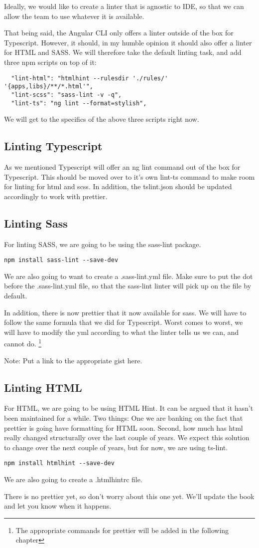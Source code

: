 Ideally, we would like to create a linter that is agnostic to IDE, so that we
can allow the team to use whatever it is available.

That being said, the Angular CLI only offers a linter outside of the box for
Typescript. However, it should, in my humble opinion it should also offer a
linter for HTML and SASS. We will therefore take the default linting task, and
add three npm scripts on top of it:

\begin{lstlisting}
  "lint-html": "htmlhint --rulesdir './rules/' '{apps,libs}/**/*.html'",
  "lint-scss": "sass-lint -v -q",
  "lint-ts": "ng lint --format=stylish",
\end{lstlisting}

We will get to the specifics of the above three scripts right now.

\subsection{ Linting Typescript }
As we mentioned Typescript will offer an ng lint command out of the box for
Typescript. This should be moved over to it's own lint-ts command to make room
for linting for html and scss. In addition, the tslint.json should be updated
accordingly to work with prettier.

\subsection{ Linting Sass }
For linting SASS, we are going to be using the sass-lint package.
\begin{lstlisting}
npm install sass-lint --save-dev
\end{lstlisting}

We are also going to want to create a .sass-lint.yml file. Make sure to put the
dot before the .sass-lint.yml file, so that the sass-lint linter will pick up
on the file by default.

In addition, there is now prettier that it now available for sass. We will have
to follow the same formula that we did for Typescript. Worst comes to worst, we
will have to modify the yml according to what the linter tells us we can, and
cannot do. \footnote{The appropriate commands for prettier will be added in the
following chapter}

Note: Put a link to the appropriate gist here.

\subsection{ Linting HTML }
For HTML, we are going to be using HTML Hint. It can be argued that it hasn't
been maintained for a while. Two things: One we are banking on the fact that
prettier is going have formatting for HTML soon. Second, how much has html really
changed structurally over the last couple of years. We expect this solution to
change over the next couple of years, but for now, we are using ts-lint.

\begin{lstlisting}
npm install htmlhint --save-dev
\end{lstlisting}

We are also going to create a .htmlhintrc file.

There is no prettier yet, so don't worry about this one yet. We'll update the
book and let you know when it happens.
